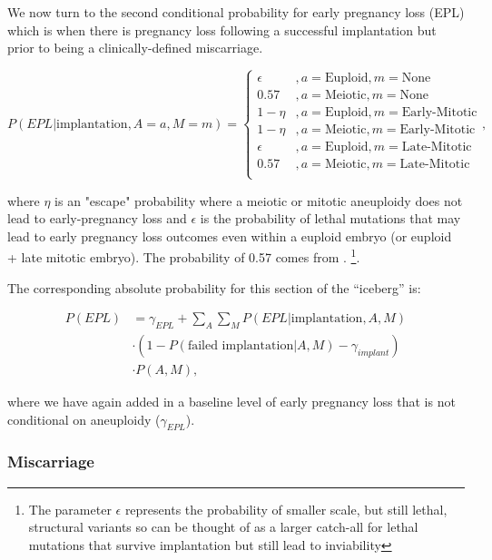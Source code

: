 \documentclass{article}
\begin{document}
We now turn to the second conditional probability for early pregnancy loss (EPL) which is when there is pregnancy loss following a successful implantation but prior to being a clinically-defined miscarriage.

\begin{equation}
	P(EPL | \text{implantation}, A=a, M=m) = \begin{cases}
	\epsilon &, a= \text{Euploid}, m=\text{None}\\
	0.57 &, a = \text{Meiotic}, m=\text{None}\\
	1 - \eta &, a = \text{Euploid}, m=\text{Early-Mitotic}\\
	1 - \eta &, a = \text{Meiotic}, m=\text{Early-Mitotic}\\
	\epsilon &, a = \text{Euploid}, m=\text{Late-Mitotic}\\
	0.57 &, a = \text{Meiotic}, m=\text{Late-Mitotic}\\
	\end{cases},
\end{equation}

where $\eta$ is an "escape" probability where a meiotic or mitotic aneuploidy does not lead to early-pregnancy loss and $\epsilon$ is the probability of lethal mutations that may lead to early pregnancy loss outcomes even within a euploid embryo (or euploid + late mitotic embryo). The probability of 0.57 comes from \citep{Gu2021-tk}. \footnote{The parameter $\epsilon$ represents the probability of smaller scale, but still lethal, structural variants so can be thought of as a larger catch-all for lethal mutations that survive implantation but still lead to inviability}. 

The corresponding absolute probability for this section of the ``iceberg'' is: 

\begin{equation}
\begin{aligned}
P(EPL) &=  \gamma_{EPL} + \sum_{A}\sum_{M} P(EPL | \text{implantation}, A, M) \\
&\cdot (1 - P(\text{failed implantation} | A, M) - \gamma_{implant})\\ 
&\cdot P(A, M),
\end{aligned}
\end{equation}

where we have again added in a baseline level of early pregnancy loss that is not conditional on aneuploidy ($\gamma_{EPL}$). 

\subsubsection*{Miscarriage}
\end{document}
